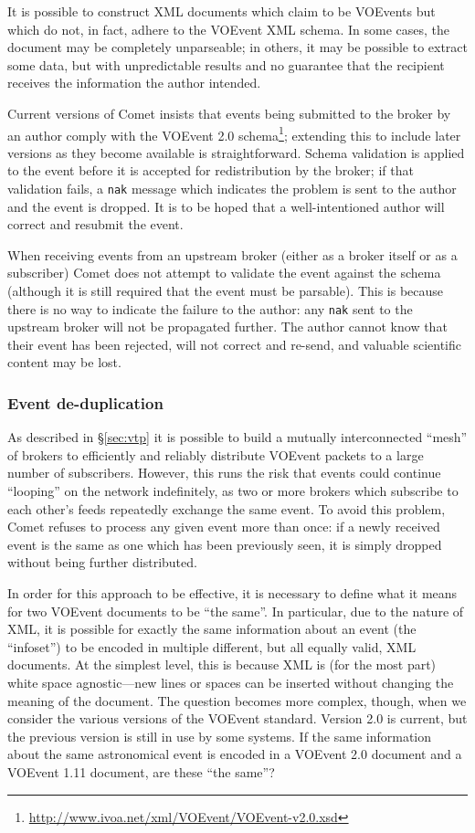 \documentclass[5p,authoryear]{elsarticle}
\begin{document}
It is possible to construct XML documents which claim to be VOEvents but which
do not, in fact, adhere to the VOEvent XML schema. In some cases, the document
may be completely unparseable; in others, it may be possible to extract some
data, but with unpredictable results and no guarantee that the recipient
receives the information the author intended.

Current versions of Comet insists that events being submitted to the broker by
an author comply with the VOEvent 2.0
schema\footnote{\url{http://www.ivoa.net/xml/VOEvent/VOEvent-v2.0.xsd}};
extending this to include later versions as they become available is
straightforward. Schema validation is applied to the event before it is
accepted for redistribution by the broker; if that validation fails, a
\texttt{nak} message which indicates the problem is sent to the author and the
event is dropped. It is to be hoped that a well-intentioned author will
correct and resubmit the event.

When receiving events from an upstream broker (either as a broker itself or as
a subscriber) Comet does not attempt to validate the event against the schema
(although it is still required that the event must be parsable). This is
because there is no way to indicate the failure to the author: any
\texttt{nak} sent to the upstream broker will not be propagated further. The
author cannot know that their event has been rejected, will not correct and
re-send, and valuable scientific content may be lost.

\subsubsection{Event de-duplication}
\label{sec:design:dedup}

As described in \S\ref{sec:vtp} it is possible to build a mutually
interconnected ``mesh'' of brokers to efficiently and reliably distribute
VOEvent packets to a large number of subscribers. However, this runs the risk
that events could continue ``looping'' on the network indefinitely, as two or
more brokers which subscribe to each other's feeds repeatedly exchange the
same event. To avoid this problem, Comet refuses to process any given event
more than once: if a newly received event is the same as one which has been
previously seen, it is simply dropped without being further distributed.

In order for this approach to be effective, it is necessary to define what it
means for two VOEvent documents to be ``the same''. In particular, due to the
nature of XML, it is possible for exactly the same information about an event
(the ``infoset'') to be encoded in multiple different, but all equally valid,
XML documents. At the simplest level, this is because XML is (for the most
part) white space agnostic---new lines or spaces can be inserted without
changing the meaning of the document. The question becomes more complex,
though, when we consider the various versions of the VOEvent standard. Version
2.0 \citep{Seaman:2011} is current, but the previous version
\citep[1.1;][]{Seaman:2006} is still in use by some systems. If the same
information about the same astronomical event is encoded in a VOEvent 2.0
document and a VOEvent 1.11 document, are these ``the same''?
\end{document}
